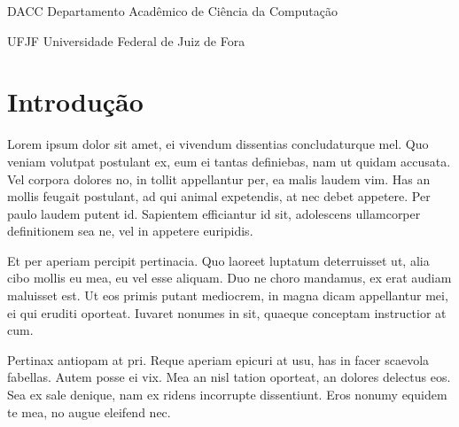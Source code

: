 \documentclass[
	12pt,				%
	openright,			%
	oneside,			%
	a4paper,			%
	english,			%
	french,				%
	spanish,			%
	brazil,				%
	]{abntex2}
\begin{document}
\begin{siglas}
    \item[DACC] Departamento Acadêmico de Ciência da Computação
    \item[UFJF] Universidade Federal de Juiz de Fora
\end{siglas}


\tableofcontents*



\textual
\setcounter{page}{1}
\chapter*{Introdução}
\label{chapter:introducao}

Lorem ipsum dolor sit amet, ei vivendum dissentias concludaturque mel. Quo veniam volutpat postulant ex, eum ei tantas definiebas, nam ut quidam accusata. Vel corpora dolores no, in tollit appellantur per, ea malis laudem vim. Has an mollis feugait postulant, ad qui animal expetendis, at nec debet appetere. Per paulo laudem putent id. Sapientem efficiantur id sit, adolescens ullamcorper definitionem sea ne, vel in appetere euripidis.

Et per aperiam percipit pertinacia. Quo laoreet luptatum deterruisset ut, alia cibo mollis eu mea, eu vel esse aliquam. Duo ne choro mandamus, ex erat audiam maluisset est. Ut eos primis putant mediocrem, in magna dicam appellantur mei, ei qui eruditi oporteat. Iuvaret nonumes in sit, quaeque conceptam instructior at cum.

Pertinax antiopam at pri. Reque aperiam epicuri at usu, has in facer scaevola fabellas. Autem posse ei vix. Mea an nisl tation oporteat, an dolores delectus eos. Sea ex sale denique, nam ex ridens incorrupte dissentiunt. Eros nonumy equidem te mea, no augue eleifend nec.
\end{document}
